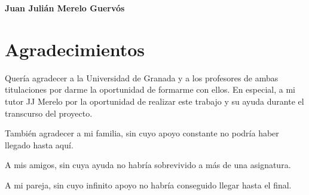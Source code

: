 \noindent \textbf{Juan Julián Merelo Guervós}

\chapter*{Agradecimientos}
\thispagestyle{empty}

       \vspace{1cm}


Quería agradecer a la Universidad de Granada y a los profesores de ambas
titulaciones por darme la oportunidad de formarme con ellos. En especial, a mi
tutor JJ Merelo por la oportunidad de realizar este trabajo y su ayuda durante
el transcurso del proyecto.

También agradecer a mi familia, sin cuyo apoyo constante no podría haber llegado
hasta aquí.

A mis amigos, sin cuya ayuda no habría sobrevivido a más de una asignatura.

A mi pareja, sin cuyo infinito apoyo no habría conseguido llegar hasta el final.
